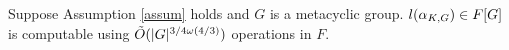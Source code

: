 % 

\begin{proposition}
Suppose Assumption \ref{assum} holds and $G$ is a metacyclic group. $l(\alpha_{K,G}) \in F[G]$ is computable using $\tilde{O}(\vert G \vert ^{3/4 \omega(4/3)})$ 
operations in $F$.
\end{proposition}


